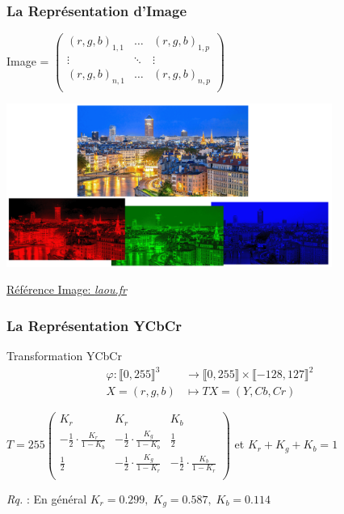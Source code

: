 \documentclass[aspectratio=43]{beamer}
\begin{document}
\begin{frame}
    \frametitle{La Représentation d'Image}

    \centering

    Image = $\begin{pmatrix}
        (r,g,b)_{1,1} & \dots & (r, g, b)_{1,p} \\
        \vdots & \ddots & \vdots \\
        (r,g,b)_{n, 1} & \dots & (r, g, b)_{n, p} \\
    \end{pmatrix}$

    \vspace*{2em}

    \includegraphics[width=0.8\textwidth]{img/diff_rgb.png}

    \tiny\raggedleft
    \href{https://a2f6z9k6.rocketcdn.me/wp-content/uploads/2019/11/ville_lyon-scaled.jpg}{Référence Image: \textit{laou.fr}}

\end{frame}

\begin{frame}
    \frametitle{La Représentation YCbCr}

    \begin{block}{Transformation YCbCr}
        \begin{align*}
            \varphi \colon \llbracket 0, 255 \rrbracket^3 & \rightarrow \llbracket 0, 255 \rrbracket \times \llbracket -128, 127 \rrbracket^2 \\
            X = (r, g, b) & \longmapsto
            TX = (Y, Cb, Cr)
          \end{align*}

      \vspace*{1em}

      $ T = 255\begin{pmatrix}
        K_r & K_r & K_b \\
        - \frac{1}{2} \cdot \frac{K_r}{1 - K_b} & - \frac{1}{2} \cdot \frac{K_g}{1 - K_b} & \frac{1}{2} \\
        \frac{1}{2} & - \frac{1}{2} \cdot \frac{K_g}{1 - K_r} & - \frac{1}{2} \cdot \frac{K_b}{1 - K_r} \\
      \end{pmatrix}$ et $K_r + K_g + K_b = 1$
    \end{block}
    \textit{Rq.} : En général $K_r = 0.299,\; K_g = 0.587, \; K_b = 0.114$

\end{frame}
\end{document}
